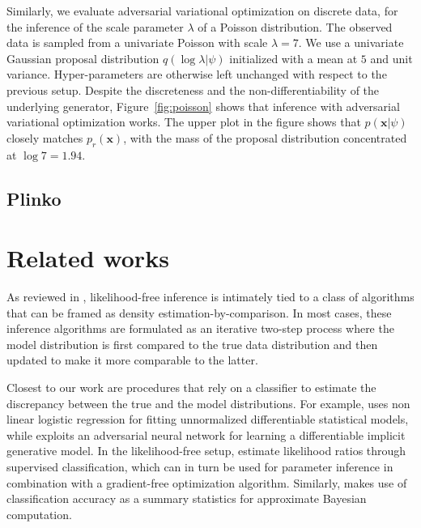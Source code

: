 \documentclass[twocolumn,superscriptaddress,aps]{revtex4-1}
\theoremstyle{plain}
\begin{document}
Similarly, we evaluate adversarial variational optimization on discrete data,
for the inference of the scale parameter $\lambda$ of a Poisson distribution.
The observed data is sampled from a univariate Poisson with scale $\lambda=7$.
We use a univariate Gaussian proposal distribution $q(\log \lambda|\psi)$
initialized with a mean at $5$ and unit variance. Hyper-parameters are otherwise
left unchanged with respect to the previous setup. Despite the discreteness
and the non-differentiability of the underlying generator, Figure~\ref{fig:poisson}
shows that inference with adversarial variational optimization works.
The upper plot in the figure shows that $p(\mathbf{x}|\psi)$ closely
matches $p_r(\mathbf{x})$, with the mass of the proposal distribution
concentrated at $\log 7 = 1.94$.


\subsection{Plinko}




\section{Related works}

As reviewed in \cite{2016arXiv161003483M}, likelihood-free inference is
intimately tied to a class of algorithms that can be framed as density
estimation-by-comparison. In most cases, these inference algorithms are
formulated as an iterative two-step process where the model distribution is
first compared to the true data distribution and then updated to make it more
comparable to the latter.

Closest to our work are procedures that rely on a classifier to estimate the
discrepancy between the true and the model distributions. For example,
\citep{gutmann2012noise} uses non linear logistic regression for fitting
unnormalized differentiable statistical models, while
\citep{goodfellow2014generative} exploits an adversarial neural network for
learning a differentiable implicit generative model. In the likelihood-free
setup, \citep{cranmer2015approximating,2016arXiv161110242D} estimate likelihood
ratios through supervised classification, which can in turn be used for
parameter inference in combination with a gradient-free optimization algorithm.
Similarly, \citep{gutmann2017likelihood} makes use of classification accuracy as
a summary statistics for approximate Bayesian computation.
\end{document}
